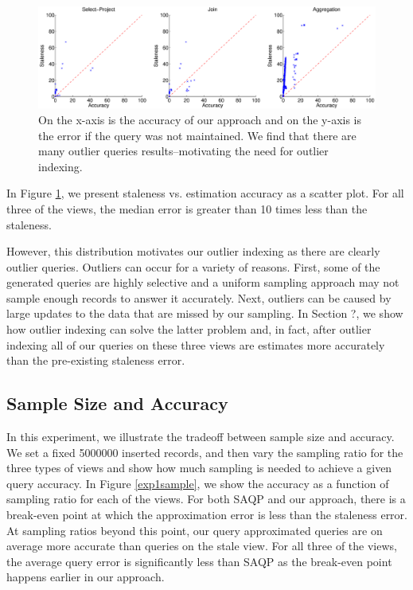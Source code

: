 \begin{figure}[ht!]
\label{exp3dist}
\hspace{-2em}
 \includegraphics[scale=0.21]{exp/exp3-query-error-dist.eps}
 \caption{On the x-axis is the accuracy of our approach and on the y-axis is the error if the query was not maintained. We find that there are many outlier queries results--motivating the need for outlier indexing.}
\end{figure}

In Figure \ref{exp3dist}, we present staleness vs. estimation accuracy as a scatter plot.
For all three of the views, the median error is greater than 10 times less than the staleness. 

However, this distribution motivates our outlier indexing as there are clearly outlier queries.
Outliers can occur for a variety of reasons.
First, some of the generated queries are highly selective and a uniform sampling approach may not sample enough records to answer it accurately.
Next, outliers can be caused by large updates to the data that are missed by our sampling.
In Section ?, we show how outlier indexing can solve the latter problem and, in fact, after outlier indexing all of our queries on these three views are estimates more accurately than the pre-existing staleness error.

\subsection{Sample Size and Accuracy}
In this experiment, we illustrate the tradeoff between sample size and accuracy.
We set a fixed 5000000 inserted records, and then vary the sampling ratio for the three types of views and show how much sampling is needed to achieve a given query accuracy.
In Figure \ref{exp1sample}, we show the accuracy as a function of sampling ratio for each of the views.
For both SAQP and our approach, there is a break-even point at which the approximation error is less than the staleness error.
At sampling ratios beyond this point, our query approximated queries are on average more accurate than queries on the stale view.
For all three of the views, the average query error is significantly less than SAQP as the break-even point happens earlier in our approach.

